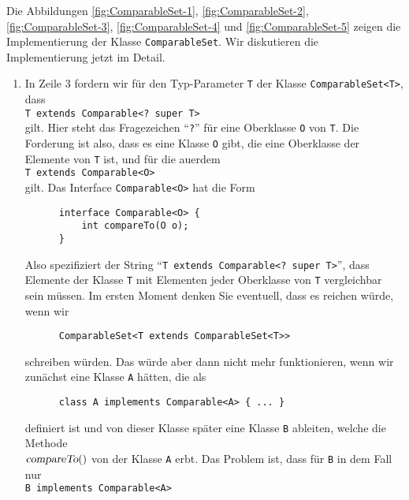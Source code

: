 Die Abbildungen 
\ref{fig:ComparableSet-1}, \ref{fig:ComparableSet-2}, \ref{fig:ComparableSet-3},
\ref{fig:ComparableSet-4} und \ref{fig:ComparableSet-5}
zeigen die Implementierung der Klasse \texttt{ComparableSet}.  Wir diskutieren die
Implementierung jetzt im Detail.
\begin{enumerate}
\item In Zeile 3 fordern wir f\"ur den Typ-Parameter \texttt{T} der Klasse
      \texttt{ComparableSet<T>}, dass
      \\[0.2cm]
      \hspace*{1.3cm}
      \texttt{T extends Comparable<? super T>}
      \\[0.2cm]
      gilt.  Hier steht das Fragezeichen ``\texttt{?}'' f\"ur eine Oberklasse \texttt{O}
      von \texttt{T}.  Die Forderung ist also, dass es eine Klasse \texttt{O} gibt, die
      eine Oberklasse der Elemente von \texttt{T} ist, und f\"ur die au\3erdem
      \\[0.2cm]
      \hspace*{1.3cm}
      \texttt{T extends Comparable<O>}
      \\[0.2cm]
      gilt.  Das Interface \texttt{Comparable<O>} hat die Form
      \begin{verbatim}
      interface Comparable<O> {
          int compareTo(O o);
      }
      \end{verbatim}
      Also spezifiziert der String ``\texttt{T extends Comparable<? super T>}'', dass
      Elemente der Klasse \texttt{T} mit Elementen jeder Oberklasse von \texttt{T}
      vergleichbar sein m\"ussen.  Im ersten Moment denken Sie eventuell, dass es reichen
      w\"urde, wenn wir 
\begin{verbatim}
      ComparableSet<T extends ComparableSet<T>>
\end{verbatim}
      schreiben w\"urden.  Das w\"urde aber dann nicht mehr funktionieren, wenn wir zun\"achst
      eine Klasse \texttt{A} h\"atten, die als
\begin{verbatim}
      class A implements Comparable<A> { ... }
\end{verbatim}
      definiert ist und von dieser Klasse sp\"ater eine Klasse \texttt{B} ableiten, welche die
      Methode\\
      $\textsl{compareTo}()$ von der Klasse \texttt{A} erbt.  Das Problem ist,
      dass f\"ur \texttt{B} in dem Fall nur
      \\[0.2cm]
      \hspace*{1.3cm}
      \texttt{B implements Comparable<A>}

\end{enumerate}
